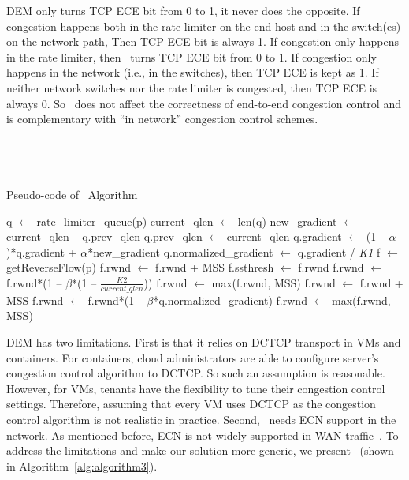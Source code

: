 DEM only turns TCP ECE bit from 0 to 1, it never does the opposite. 
If congestion happens both in the rate 
limiter on the end-host and in the switch(es) on the network path, Then TCP ECE bit is always 1. 
If congestion only happens
in the rate limiter, then~\dem{} turns TCP ECE bit from 0 to 1. 
If congestion only happens in the network (i.e., in the switches), then TCP ECE is kept as 1.
If neither network switches nor the rate limiter is congested, then TCP ECE is always 0.
So~\dem{} does not affect the correctness of end-to-end
congestion control and is complementary with ``in network'' congestion control schemes.

\subsection{~\spring{}}

\begin{algorithm}[!t]
\caption{Pseudo-code of~\spring{} Algorithm}
\label{alg:algorithm3}
\begin{algorithmic}[1]
\STATE q $\leftarrow$ rate\_limiter\_queue(p)
\STATE current\_qlen $\leftarrow$ len(q)
\STATE new\_gradient $\leftarrow$ current\_qlen -- q.prev\_qlen
\STATE q.prev\_qlen $\leftarrow$ current\_qlen
\STATE q.gradient $\leftarrow$ (1 -- $\alpha$)*q.gradient + $\alpha$*new\_gradient
\STATE q.normalized\_gradient $\leftarrow$ q.gradient / {\emph {K1}}
\STATE f $\leftarrow$ getReverseFlow(p)
\STATE f.rwnd $\leftarrow$ f.rwnd + MSS
\STATE f.ssthresh $\leftarrow$ f.rwnd
\STATE f.rwnd $\leftarrow$ f.rwnd*(1 -- $\beta$*(1 -- $\frac{K2}{current\_qlen}$))
\STATE f.rwnd $\leftarrow$ max(f.rwnd, MSS)
\STATE f.rwnd $\leftarrow$ f.rwnd + MSS
\ELSE
\STATE f.rwnd $\leftarrow$ f.rwnd*(1 -- $\beta$*q.normalized\_gradient)
\STATE f.rwnd $\leftarrow$ max(f.rwnd, MSS)
\ENDIF
\ENDIF
\ENDFOR
\end{algorithmic}
\end{algorithm}

DEM has two limitations. First is that it relies on 
DCTCP transport in VMs and containers. For containers, cloud administrators are able to configure
server's congestion control algorithm to DCTCP. So such an assumption is reasonable. 
However, for VMs, tenants have the flexibility to tune their congestion control settings.
Therefore, assuming that every VM uses DCTCP as the congestion control algorithm is not realistic in practice.
Second,~\dem{} needs ECN support in the network. As mentioned before, 
ECN is not widely supported in WAN traffic~\cite{kuhlewind2013state}.
To address the limitations and make our solution more generic, we present~\spring{} (shown in Algorithm~\ref{alg:algorithm3}).

